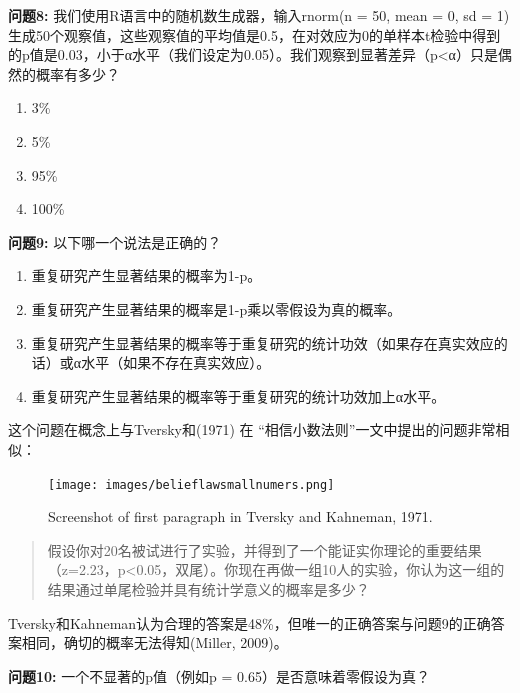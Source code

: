 \documentclass[
  letterpaper,
  DIV=11,
  numbers=noendperiod]{scrreprt}
\providecommand{\tightlist}{%
  \setlength{\itemsep}{0pt}\setlength{\parskip}{0pt}}\usepackage{longtable,booktabs,array}
\begin{document}
\textbf{问题8:} 我们使用R语言中的随机数生成器，输入rnorm(n = 50, mean =
0, sd =
1)生成50个观察值，这些观察值的平均值是0.5，在对效应为0的单样本t检验中得到的p值是0.03，小于α水平（我们设定为0.05）。我们观察到显著差异（p\textless α）只是偶然的概率有多少？

\begin{enumerate}
\def\labelenumi{\Alph{enumi})}
\tightlist
\item
  3\%
\item
  5\%
\item
  95\%
\item
  100\%
\end{enumerate}

\textbf{问题9:} 以下哪一个说法是正确的？

\begin{enumerate}
\def\labelenumi{\Alph{enumi})}
\tightlist
\item
  重复研究产生显著结果的概率为1-p。
\item
  重复研究产生显著结果的概率是1-p乘以零假设为真的概率。
\item
  重复研究产生显著结果的概率等于重复研究的统计功效（如果存在真实效应的话）或α水平（如果不存在真实效应）。
\item
  重复研究产生显著结果的概率等于重复研究的统计功效加上α水平。
\end{enumerate}

这个问题在概念上与Tversky和(1971) 在
``相信小数法则''一文中提出的问题非常相似：

\begin{figure}

{\centering \texttt{[image: images/belieflawsmallnumers.png]}

}

\caption{\label{fig-smallnumbers}Screenshot of first paragraph in
Tversky and Kahneman, 1971.}

\end{figure}

\begin{quote}
假设你对20名被试进行了实验，并得到了一个能证实你理论的重要结果（z=2.23，p\textless0.05，双尾）。你现在再做一组10人的实验，你认为这一组的结果通过单尾检验并具有统计学意义的概率是多少？
\end{quote}

Tversky和Kahneman认为合理的答案是48\%，但唯一的正确答案与问题9的正确答案相同，确切的概率无法得知(Miller,
2009)。

\textbf{问题10:} 一个不显著的p值（例如p = 0.65）是否意味着零假设为真？
\end{document}
